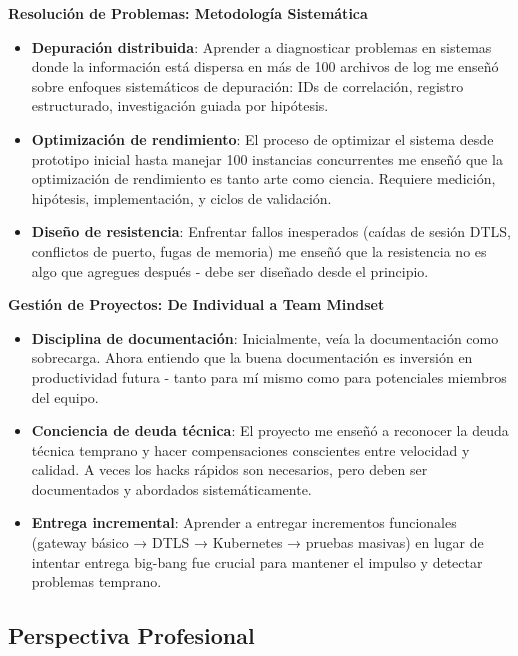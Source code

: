 \textbf{Resolución de Problemas: Metodología Sistemática}

\begin{itemize}
    \item \textbf{Depuración distribuida}: Aprender a diagnosticar problemas en sistemas donde la información está dispersa en más de 100 archivos de log me enseñó sobre enfoques sistemáticos de depuración: IDs de correlación, registro estructurado, investigación guiada por hipótesis.
    
    \item \textbf{Optimización de rendimiento}: El proceso de optimizar el sistema desde prototipo inicial hasta manejar 100 instancias concurrentes me enseñó que la optimización de rendimiento es tanto arte como ciencia. Requiere medición, hipótesis, implementación, y ciclos de validación.
    
    \item \textbf{Diseño de resistencia}: Enfrentar fallos inesperados (caídas de sesión DTLS, conflictos de puerto, fugas de memoria) me enseñó que la resistencia no es algo que agregues después - debe ser diseñado desde el principio.
\end{itemize}

\textbf{Gestión de Proyectos: De Individual a Team Mindset}

\begin{itemize}
    \item \textbf{Disciplina de documentación}: Inicialmente, veía la documentación como sobrecarga. Ahora entiendo que la buena documentación es inversión en productividad futura - tanto para mí mismo como para potenciales miembros del equipo.
    
    \item \textbf{Conciencia de deuda técnica}: El proyecto me enseñó a reconocer la deuda técnica temprano y hacer compensaciones conscientes entre velocidad y calidad. A veces los hacks rápidos son necesarios, pero deben ser documentados y abordados sistemáticamente.
    
    \item \textbf{Entrega incremental}: Aprender a entregar incrementos funcionales (gateway básico → DTLS → Kubernetes → pruebas masivas) en lugar de intentar entrega big-bang fue crucial para mantener el impulso y detectar problemas temprano.
\end{itemize}

\subsection{Perspectiva Profesional}

